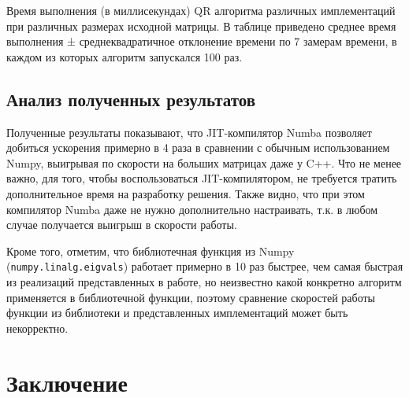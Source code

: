 \documentclass[12pt, fleqn]{article}
\begin{document}
\begin{center}
	
	\begin{table}[h!]
		\caption{Время выполнения (в миллисекундах) QR алгоритма различных имплементаций при различных размерах исходной матрицы. В таблице приведено среднее время выполнения ± среднеквадратичное отклонение времени по 7 замерам времени, в каждом из которых алгоритм запускался 100 раз.}
		\label{tabular:results}
	\end{table}
\end{center}

\subsection{Анализ полученных результатов}

Полученные результаты показывают, что JIT-компилятор Numba позволяет добиться ускорения примерно в 4 раза в сравнении с обычным использованием Numpy, выигрывая по скорости на больших матрицах даже у C++. Что не менее важно, для того, чтобы воспользоваться JIT-компилятором, не требуется тратить дополнительное время на разработку решения. Также видно, что при этом компилятор Numba даже не нужно дополнительно настраивать, т.к. в любом случае получается выигрыш в скорости работы.

Кроме того, отметим, что библиотечная функция из Numpy (\texttt{numpy.linalg.eigvals}) работает примерно в 10 раз быстрее, чем самая быстрая из реализаций представленных в работе, но неизвестно какой конкретно алгоритм применяется в библиотечной функции, поэтому сравнение скоростей работы функции из библиотеки и представленных имплементаций может быть некорректно.

\section{Заключение}
\end{document}

